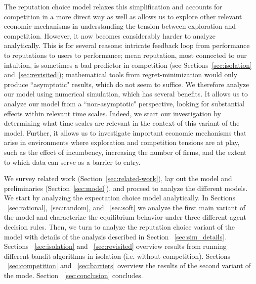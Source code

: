 {The reputation choice model relaxes this simplification and accounts for competition in a more direct way as well as allows us to explore other relevant economic mechanisms in understanding the tension between exploration and competition. However, it now becomes considerably harder to analyze analytically. This is for several reasons: intricate feedback loop from performance to reputations to users to performance;
%
mean reputation, most connected to our intuition, is sometimes a bad predictor in competition (see Sections~\ref{sec:isolation} and~\ref{sec:revisited});
%
mathematical tools from regret-minimization would only produce ``asymptotic" results, which do not seem to suffice. We therefore analyze our model using numerical simulation, which has several benefits. It allows us to analyze our model from a ``non-asymptotic" perspective, looking for substantial effects within relevant time scales. Indeed, we start our investigation by determining what time scales are relevant in the context of this variant of the model. Further, it allows us to investigate important economic mechanisms that arise in environments where exploration and competition tensions are at play, such as the effect of incumbency, increasing the number of firms, and the extent to which data can serve as a barrier to entry.

We survey related work (Section~\ref{sec:related-work}), lay out the model and preliminaries (Section~\ref{sec:model}), and proceed to analyze the different models. We start by analyzing the expectation choice model analytically. In Sections ~\ref{sec:rational},~\ref{sec:random}, and ~\ref{sec:soft} we analyze the first main variant of the model and characterize the equilibrium behavior under three different agent decision rules. Then, we turn to analyze the reputation choice variant of the model with details of the analysis described in Section ~\ref{sec:sim_details}. Sections ~\ref{sec:isolation} and ~\ref{sec:revisited} overview results from running different bandit algorithms in isolation (i.e. without competition). Sections ~\ref{sec:competition} and ~\ref{sec:barriers} overview the results of the second variant of the mode. Section ~\ref{sec:conclusion} concludes.
}



